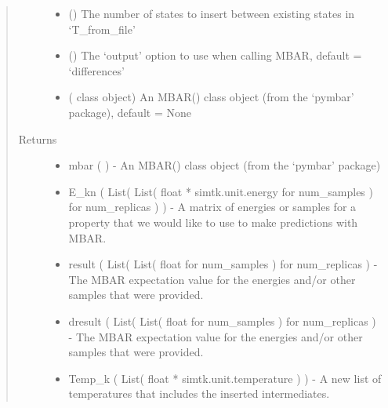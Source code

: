 \documentclass[letterpaper,12pt,english,openany,oneside]{sphinxmanual}
\begin{document}
\begin{fulllineitems}
\begin{quote}
\begin{description}
\begin{itemize}
\item {} 
 () \textendash{} The number of states to insert between existing states in ‘T\_from\_file’

\item {} 
 () \textendash{} The ‘output’ option to use when calling MBAR, default = ‘differences’

\item {} 
 ( class object) \textendash{} An MBAR() class object (from the ‘pymbar’ package), default = None

\end{itemize}

\item[{Returns}] \leavevmode
\begin{itemize}
\item {} 
mbar (  ) - An MBAR() class object (from the ‘pymbar’ package)

\end{itemize}
\begin{itemize}
\item {} 
E\_kn ( List( List( float * simtk.unit.energy for num\_samples ) for num\_replicas ) ) - A matrix of energies or samples for a property that we would like to use to make predictions with MBAR.

\item {} 
result ( List( List( float for num\_samples ) for num\_replicas ) - The MBAR expectation value for the energies and/or other samples that were provided.

\item {} 
dresult ( List( List( float for num\_samples ) for num\_replicas ) - The MBAR expectation value for the energies and/or other samples that were provided.

\item {} 
Temp\_k ( List( float * simtk.unit.temperature ) ) - A new list of temperatures that includes the inserted intermediates.

\end{itemize}


\end{description}\end{quote}

\end{fulllineitems}
\end{document}
